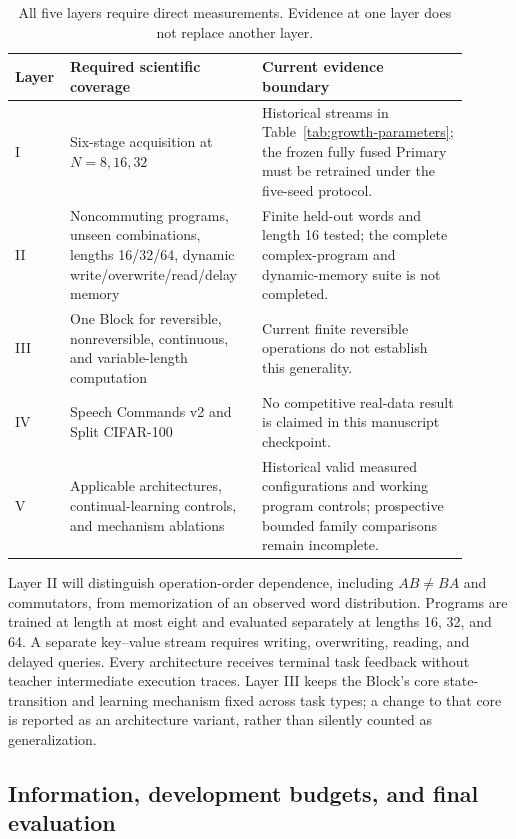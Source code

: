\begin{table}[t]
\centering
\small
\begin{tabular}{p{0.07\linewidth}p{0.40\linewidth}p{0.43\linewidth}}
\toprule
Layer & Required scientific coverage & Current evidence boundary\\
\midrule
I & Six-stage acquisition at $N=8,16,32$ & Historical streams in
Table~\ref{tab:growth-parameters}; the frozen fully fused Primary must be
retrained under the five-seed protocol.\\
II & Noncommuting programs, unseen combinations, lengths 16/32/64, dynamic
write/overwrite/read/delay memory & Finite held-out words and length 16 tested;
the complete complex-program and dynamic-memory suite is not completed.\\
III & One Block for reversible, nonreversible, continuous, and variable-length
computation & Current finite reversible operations do not establish this
generality.\\
IV & Speech Commands v2 and Split CIFAR-100 & No competitive real-data result
is claimed in this manuscript checkpoint.\\
V & Applicable architectures, continual-learning controls, and mechanism
ablations & Historical valid measured configurations and working program
controls; prospective bounded family comparisons remain incomplete.\\
\bottomrule
\end{tabular}
\caption{All five layers require direct measurements. Evidence at one layer
does not replace another layer.}
\label{tab:benchmark-layers}
\end{table}

Layer II will distinguish operation-order dependence, including $AB\ne BA$
and commutators, from memorization of an observed word distribution. Programs
are trained at length at most eight and evaluated separately at lengths
16, 32, and 64. A separate key--value stream requires writing, overwriting,
reading, and delayed queries. Every architecture receives terminal task feedback
without teacher intermediate execution traces. Layer III keeps the Block's
core state-transition and learning mechanism fixed across task types; a change
to that core is reported as an architecture variant, rather than silently
counted as generalization.

\subsection{Information, development budgets, and final evaluation}

